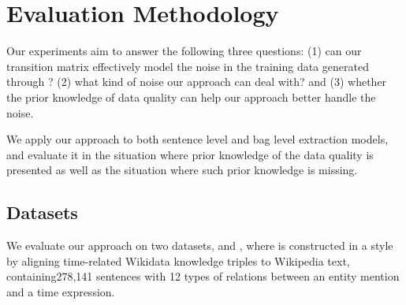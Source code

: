 \section{Evaluation Methodology}

Our experiments aim to answer the following three questions: (1) can our
transition matrix effectively model the noise in the training data generated
through \DS? (2) what kind of noise our approach can deal with? and (3)
whether the prior knowledge of data quality can help our approach better
handle the noise.

We apply our approach to both sentence level and bag level
extraction models, and evaluate it in the situation where prior knowledge of
the data quality is presented as well as the situation where such prior
knowledge is missing.


\subsection{Datasets}
We evaluate our approach on two datasets, \TimeRE and \EntityRE,  %
where \TimeRE is constructed
in a \DS style by aligning time-related Wikidata knowledge triples to
Wikipedia text, containing278,141 sentences with 12
types of relations  between an entity mention and a time expression.

